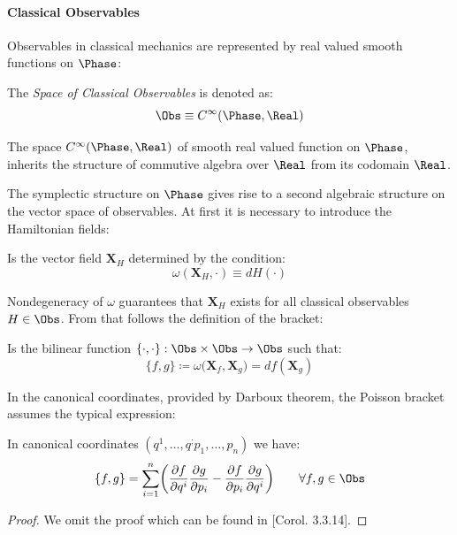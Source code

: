\documentclass[Main]{subfiles}
\begin{document}
	\paragraph{Classical Observables}
		Observables in classical mechanics are represented by real valued smooth functions on $\Phase$:
	\begin{notationfix}
		The \emph{Space of Classical Observables} is denoted as:
		\begin{displaymath}
			\Obs \equiv		C^\infty(\Phase,\Real)
		\end{displaymath}
	\end{notationfix}
	\begin{observation}
		The space  $C^\infty(\Phase,\Real)$ of smooth real valued function on $\Phase$,  inherits the structure of commutive algebra over $\Real$ from its codomain $\Real$.
	\end{observation}
	The symplectic structure on $\Phase$ gives rise to a second algebraic structure on the vector space of observables.
	At first it is necessary to introduce the Hamiltonian fields:
	\begin{definition}
		Is the vector field $\mathbf{X}_H$ determined by the condition:
		\begin{displaymath}
			\omega( \mathbf{X}_H,  \cdot )\equiv dH (\cdot)
		\end{displaymath}
	\end{definition}
	Nondegeneracy of $\omega$ guarantees that $\mathbf{X}_H$ exists for all classical observables $H\in \Obs$.
	From that follows the definition of the bracket:
	\begin{definition}
		Is the bilinear function 	$\{\cdot, \cdot\} : \Obs \times \Obs \rightarrow \Obs$ such that:
		\begin{equation}
			\{ f, g \} \coloneqq \omega \big( \mathbf{X}_f , \mathbf{X}_g \big) = df ( \mathbf{X}_g)
		\end{equation}
	\end{definition}	
	
	In the canonical coordinates, provided  by  Darboux theorem, the  Poisson bracket assumes the typical expression:
	\begin{proposition}
	
	In canonical coordinates  $(q^1, \ldots, q^; p_1, \ldots, p_n)$ we have:
	\begin{equation}\label{Eq:SymplecticCoordinateRepresentation}
		\{f,g\} = \sum_{i=1}^n \biggr(\frac{\partial f}{\partial q^i} \frac{\partial g}{\partial p_i}  - \frac{\partial f}{\partial p_i} \frac{\partial g}{\partial q^i} \biggr) \qquad \forall f,g \in \Obs
	\end{equation}
	\end{proposition}
	\begin{proof}
			We omit the proof which can be found in \cite{Abraham1978}[Corol. 3.3.14].
	\end{proof}
\end{document}
